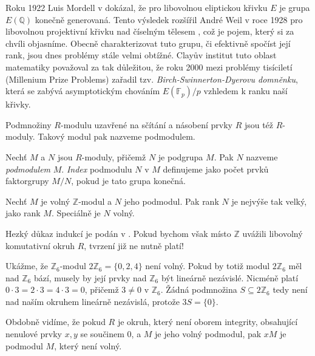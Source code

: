 \documentclass[12pt]{report}
\begin{document}
\begin{poznamka}
Roku 1922 Luis Mordell v \cite{Mordell} dokázal, že pro libovolnou eliptickou křivku $E$ je grupa $E(\mathbb{Q})$ konečně generovaná. Tento výsledek rozšířil André Weil v roce 1928 pro libovolnou projektivní křivku nad číselným tělesem \cite{Weil}, což je pojem, který si za chvíli objasníme. Obecně charakterizovat tuto grupu, či efektivně spočíst její rank, jsou dnes problémy stále velmi obtížné. Clayův institut tuto oblast matematiky považoval za tak důležitou, že roku 2000 mezi problémy tisíciletí (Millenium Prize Problems) zařadil tzv. \textit{Birch-Swinnerton-Dyerovu domněnku}, která se zabývá asymptotickým chováním $E(\mathbb{F}_p)/p$ vzhledem k ranku naší křivky. 
\end{poznamka}

Podmnožiny $R$-modulu uzavřené na sčítání a násobení prvky $R$ jsou též $R$-moduly. Takový modul pak nazveme podmodulem.

\begin{definice}
Nechť $M$ a $N$ jsou $R$-moduly, přičemž $N$ je podgrupa $M$. Pak $N$ nazveme \textit{podmodulem} $M$. \textit{Index} podmodulu $N$ v $M$ definujeme jako počet prvků faktorgrupy $M / N$, pokud je tato grupa konečná.
\end{definice}

\begin{veta}\label{podmodul}
Nechť $M$ je volný $\mathbb{Z}$-modul a $N$ jeho podmodul. Pak rank $N$ je nejvýše tak velký, jako rank $M$. Speciálně je $N$ volný.
\end{veta}

Hezký důkaz indukcí je podán v \cite[Věta~1.3.8]{Pupik}. Pokud bychom však místo $\mathbb{Z}$ uvážili libovolný komutativní okruh $R$, tvrzení již ne nutně platí!
\begin{priklad}
Ukážme, že $\mathbb{Z}_6$-modul $2\mathbb{Z}_6 = \lbrace 0,2,4 \rbrace$ není volný. Pokud by totiž modul $2 \mathbb{Z}_6$ měl nad $\mathbb{Z}_6$ bází, musely by její prvky nad $\mathbb{Z}_6$ být lineárně nezávislé. Nicméně platí $0 \cdot 3 = 2 \cdot 3  = 4 \cdot 3 = 0$, přičemž $3 \neq 0$ v $\mathbb{Z}_6$. Žádná podmnožina $S \subseteq 2 \mathbb{Z}_6$ tedy není nad naším okruhem lineárně nezávislá, protože $3 S = \lbrace 0 \rbrace$.
\end{priklad}

Obdobně vidíme, že pokud $R$ je okruh, který není oborem integrity, obsahující nenulové prvky $x, y$ se součinem $0$, a $M$ je jeho volný podmodul, pak $x M$ je podmodul $M$, který není volný.
\end{document}
